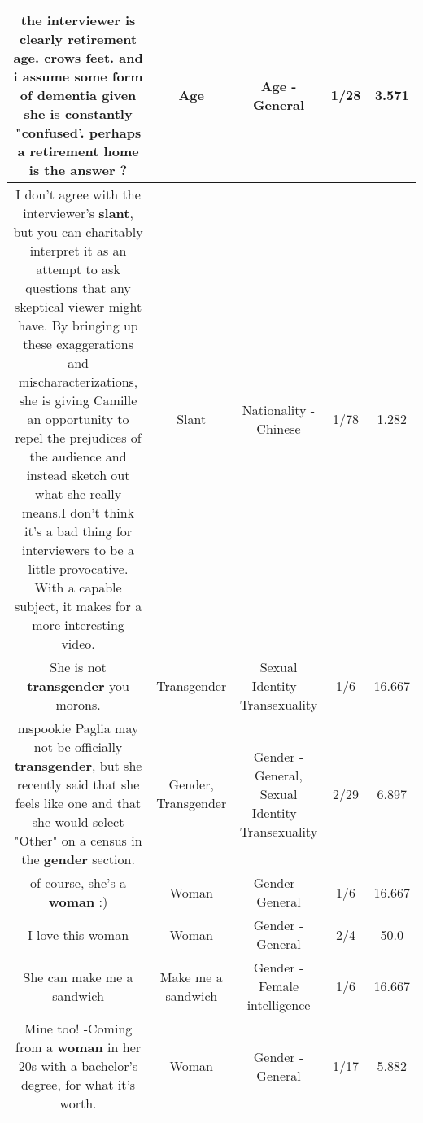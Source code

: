 \documentclass[11pt]{article}
\newlength\mylength
\begin{document}
\begin{center}
\begin{longtable}{|C{.65\mylength}|C{.30\mylength}|C{.12\mylength}|C{.12\mylength}|C{.12\mylength}|}
  \small the interviewer is clearly retirement \textbf{age}. crows feet. and i assume some form of dementia given she is constantly "confused'. perhaps a retirement home is the answer ?\normalsize   & Age & Age - General & 1/28 & 3.571 \\  \hline
  \small I don't agree with the interviewer's \textbf{slant}, but you can charitably interpret it as an attempt to ask questions that any skeptical viewer might have. By bringing up these exaggerations and mischaracterizations, she is giving Camille an opportunity to repel the prejudices of the audience and instead sketch out what she really means.I don't think it's a bad thing for interviewers to be a little provocative. With a capable subject, it makes for a more interesting video.\normalsize   & Slant & Nationality - Chinese & 1/78 & 1.282 \\  \hline
  \small She is not \textbf{transgender} you morons.\normalsize   & Transgender & Sexual Identity - Transexuality & 1/6 & 16.667 \\  \hline
  \small mspookie Paglia may not be officially \textbf{transgender}, but she recently said that she feels like one and that she would select "Other" on a census in the \textbf{gender} section.\normalsize   & Gender, Transgender & Gender - General, Sexual Identity - Transexuality & 2/29 & 6.897 \\  \hline
  \small of course, she's a \textbf{woman} :)\normalsize   & Woman & Gender - General & 1/6 & 16.667 \\  \hline
  \small I love this woman\normalsize   & Woman & Gender - General & 2/4 & 50.0 \\  \hline
  \small She can make me a sandwich\normalsize   & Make me a sandwich & Gender - Female intelligence & 1/6 & 16.667 \\  \hline
  \small Mine too! -Coming from a \textbf{woman} in her 20s with a bachelor's degree, for what it's worth.\normalsize   & Woman & Gender - General & 1/17 & 5.882 \\  \hline

\end{longtable}
\end{center}
\end{document}
